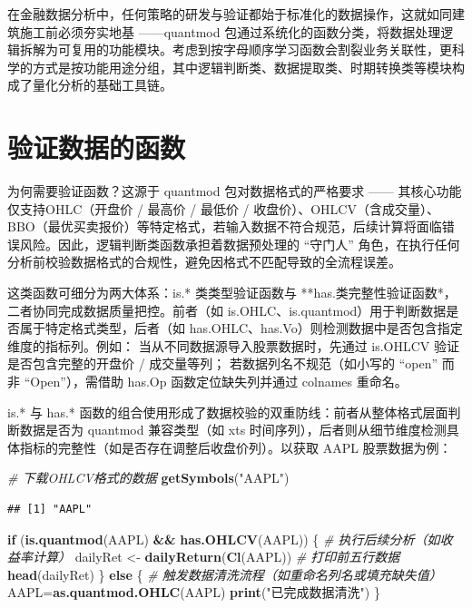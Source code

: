 \documentclass[]{ctexbook}
\newenvironment{Shaded}{\begin{snugshade}}{\end{snugshade}}
\newcommand{\CommentTok}[1]{\textcolor[rgb]{0.56,0.35,0.01}{\textit{#1}}}
\newcommand{\ControlFlowTok}[1]{\textcolor[rgb]{0.13,0.29,0.53}{\textbf{#1}}}
\newcommand{\FunctionTok}[1]{\textcolor[rgb]{0.13,0.29,0.53}{\textbf{#1}}}
\newcommand{\NormalTok}[1]{#1}
\newcommand{\OtherTok}[1]{\textcolor[rgb]{0.56,0.35,0.01}{#1}}
\newcommand{\SpecialCharTok}[1]{\textcolor[rgb]{0.81,0.36,0.00}{\textbf{#1}}}
\newcommand{\StringTok}[1]{\textcolor[rgb]{0.31,0.60,0.02}{#1}}
\begin{document}
在金融数据分析中，任何策略的研发与验证都始于标准化的数据操作，这就如同建筑施工前必须夯实地基 ------quantmod 包通过系统化的函数分类，将数据处理逻辑拆解为可复用的功能模块。考虑到按字母顺序学习函数会割裂业务关联性，更科学的方式是按功能用途分组，其中逻辑判断类、数据提取类、时期转换类等模块构成了量化分析的基础工具链。

\section{验证数据的函数}\label{ux9a8cux8bc1ux6570ux636eux7684ux51fdux6570}

为何需要验证函数？这源于 quantmod 包对数据格式的严格要求 ------ 其核心功能仅支持OHLC（开盘价 / 最高价 / 最低价 / 收盘价）、OHLCV（含成交量）、BBO（最优买卖报价）等特定格式，若输入数据不符合规范，后续计算将面临错误风险。因此，逻辑判断类函数承担着数据预处理的 ``守门人'' 角色，在执行任何分析前校验数据格式的合规性，避免因格式不匹配导致的全流程误差。

这类函数可细分为两大体系：is.* 类类型验证函数与 **has.类完整性验证函数*，二者协同完成数据质量把控。前者（如 is.OHLC、is.quantmod）用于判断数据是否属于特定格式类型，后者（如 has.OHLC、has.Vo）则检测数据中是否包含指定维度的指标列。例如：
当从不同数据源导入股票数据时，先通过 is.OHLCV 验证是否包含完整的开盘价 / 成交量等列；
若数据列名不规范（如小写的 ``open'' 而非 ``Open''），需借助 has.Op 函数定位缺失列并通过 colnames 重命名。

is.* 与 has.* 函数的组合使用形成了数据校验的双重防线：前者从整体格式层面判断数据是否为 quantmod 兼容类型（如 xts 时间序列），后者则从细节维度检测具体指标的完整性（如是否存在调整后收盘价列）。以获取 AAPL 股票数据为例：

\begin{Shaded}
\begin{Highlighting}[]
\CommentTok{\# 下载OHLCV格式的数据}
\FunctionTok{getSymbols}\NormalTok{(}\StringTok{"AAPL"}\NormalTok{)  }
\end{Highlighting}
\end{Shaded}

\begin{verbatim}
## [1] "AAPL"
\end{verbatim}

\begin{Shaded}
\begin{Highlighting}[]
\ControlFlowTok{if}\NormalTok{ (}\FunctionTok{is.quantmod}\NormalTok{(AAPL) }\SpecialCharTok{\&\&} \FunctionTok{has.OHLCV}\NormalTok{(AAPL)) \{}
  \CommentTok{\# 执行后续分析（如收益率计算）}
\NormalTok{  dailyRet }\OtherTok{\textless{}{-}} \FunctionTok{dailyReturn}\NormalTok{(}\FunctionTok{Cl}\NormalTok{(AAPL))}
  \CommentTok{\# 打印前五行数据}
  \FunctionTok{head}\NormalTok{(dailyRet)}
\NormalTok{\} }\ControlFlowTok{else}\NormalTok{ \{}
  \CommentTok{\# 触发数据清洗流程（如重命名列名或填充缺失值）}
\NormalTok{  AAPL}\OtherTok{=}\FunctionTok{as.quantmod.OHLC}\NormalTok{(AAPL)}
  \FunctionTok{print}\NormalTok{(}\StringTok{"已完成数据清洗"}\NormalTok{)}
\NormalTok{\}}
\end{Highlighting}
\end{Shaded}
\end{document}
